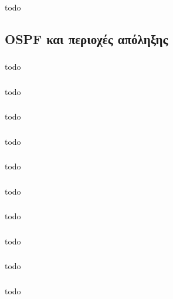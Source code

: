 \documentclass[a4paper, 12pt]{article}
\begin{document}
		\subsubsection{}
			todo

	\subsection{OSPF και περιοχές απόληξης}

		\subsubsection{}
			todo

		\subsubsection{}
			todo

		\subsubsection{}
			todo

		\subsubsection{}
			todo

		\subsubsection{}
			todo

		\subsubsection{}
			todo

		\subsubsection{}
			todo

		\subsubsection{}
			todo

		\subsubsection{}
			todo

		\subsubsection{}
			todo
\end{document}
